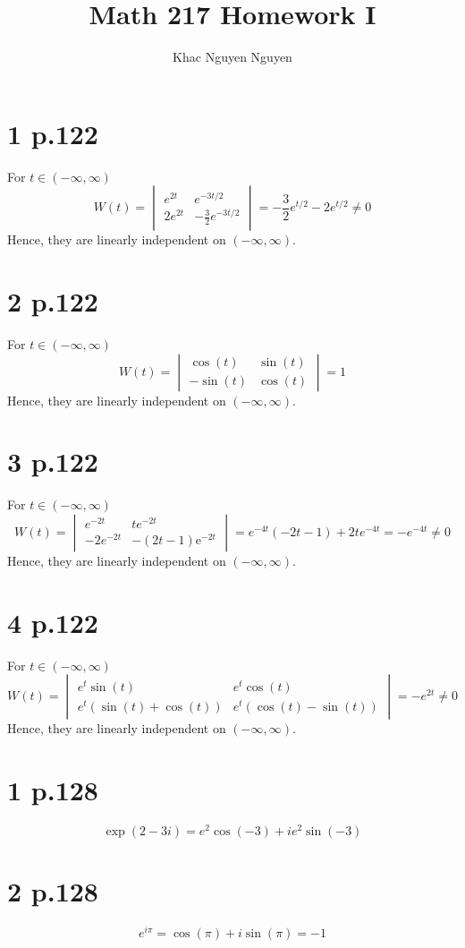 \documentclass[11pt]{article}
\title{\textbf{Math 217 Homework I}}
\author{Khac Nguyen Nguyen}
\date{}
\begin{document}
\section*{1 p.122}
For $t \in (-\infty, \infty)$
\[
    W(t) = 
    \begin{vmatrix}
    e^{2t} & e^{-3t/2} \\
    2e^{2t} &-\frac{3}{2}e^{-3t/2}
    \end{vmatrix} 
    = -\frac{3}{2} e^{t/2} - 2e^{t/2} \ne 0
\]
Hence, they are linearly independent on $(-\infty, \infty)$.
\newpage
\section*{2 p.122}
For $t \in (-\infty, \infty)$
\[
    W(t) = 
    \begin{vmatrix}
    \cos(t) & \sin(t) \\
    -\sin(t) & \cos(t)
    \end{vmatrix} 
    = 1
\]
Hence, they are linearly independent on $(-\infty, \infty)$.
\newpage
\section*{3 p.122}
For $t \in (-\infty, \infty)$
\[
    W(t) = 
    \begin{vmatrix}
    e^{-2t} & te^{-2t} \\
    -2e^{-2t} & -\left(2t-1\right)\mathrm{e}^{-2t}
    \end{vmatrix} 
    = e^{-4t}(-2t-1) + 2te^{-4t} = -e^{-4t} \ne 0
\]
Hence, they are linearly independent on $(-\infty, \infty)$.
\newpage
\section*{4 p.122}
For $t \in (-\infty, \infty)$
\[
    W(t) = 
    \begin{vmatrix}
    e^t \sin(t) & e^t \cos(t) \\
    e^t (\sin(t) + \cos(t)) & e^t(\cos(t) - \sin(t))
    \end{vmatrix} 
    = -e^{2t} \ne 0
\]
Hence, they are linearly independent on $(-\infty, \infty)$.
\newpage
\section*{1 p.128}
\[
    \exp(2-3i) = e^2 \cos(-3) + ie^2 \sin(-3)
\]
\newpage
\section*{2 p.128}
\[
    e^{i\pi} = \cos(\pi) + i\sin(\pi) = -1    
\]
\newpage
\end{document}
